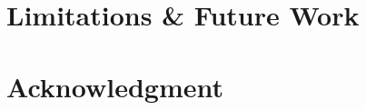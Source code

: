 \documentclass[conference]{IEEEtran}
\begin{document}
\section{Limitations \& Future Work}

\section*{Acknowledgment}






%





\end{document}
